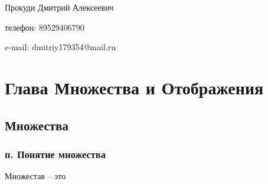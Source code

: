 


    Прокуди Дмитрий Алексеевич

    телефон: 89529406790

    e-mail: dmitriy179354@mail.ru 

    \section{Глава Множества и Отображения}
    \subsection{Множества}
    \subsubsection{п. Понятие множества}
    Множестав -- это 
